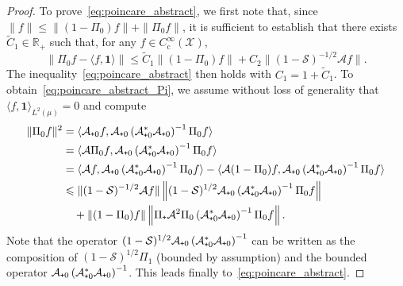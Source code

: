 \documentclass{article}
\newcommand{\cLs}{\mathcal{S}}
\newcommand{\cLa}{\mathcal{A}}
\newcommand{\cX}{\mathcal{X}}
\newcommand{\subplus}{\textnormal{\texttt{+}}}
\renewcommand{\leq}{\leqslant}
\begin{document}
\begin{proof}
To prove~\eqref{eq:poincare_abstract}, we first note that, since $\| f \| \leq \| (1-\Pi_0)f \| + \| \Pi_0 f \|$, it is sufficient to establish that there exists $\widetilde{C}_1 \in \mathbb{R}_+$ such that, for any $f \in C_\mathrm{c}^\infty(\cX)$,
\begin{equation}
  \label{eq:poincare_abstract_Pi}
  \left\| \Pi_0 f - \langle f,\mathbf{1}\rangle \right\| \leq \widetilde{C}_1 \| (1-\Pi_0)f \| + C_2 \| (1-\cLs)^{-1/2} \cLa f \|.
\end{equation}
The inequality~\eqref{eq:poincare_abstract} then holds with $C_1 = 1 + \widetilde{C}_1$. To obtain~\eqref{eq:poincare_abstract_Pi}, we assume without loss of generality that $\langle f,\mathbf{1}\rangle_{L^2(\mu)} = 0$ and compute
\[
  \begin{aligned}
    \| \Pi_0 f \|^2 & = \langle \cLa_{\subplus 0} f , \cLa_{\subplus 0} \left(\cLa_{\subplus 0}^* \cLa_{\subplus 0}\right)^{-1} \Pi_0 f \rangle  \\
    & = \langle \cLa \Pi_0 f , \cLa_{\subplus 0} \left(\cLa_{\subplus 0}^* \cLa_{\subplus 0}\right)^{-1} \Pi_0 f \rangle  \\
    & = \langle \cLa f , \cLa_{\subplus 0} \left(\cLa_{\subplus 0}^* \cLa_{\subplus 0}\right)^{-1} \Pi_0 f \rangle - \langle \cLa (1-\Pi_0) f , \cLa_{\subplus 0} \left(\cLa_{\subplus 0}^* \cLa_{\subplus 0}\right)^{-1} \Pi_0 f \rangle \\
    & \leq \|(1-\cLs)^{-1/2}\cLa f\| \left\|(1-\cLs)^{1/2} \cLa_{\subplus 0} \left(\cLa_{\subplus 0}^* \cLa_{\subplus 0}\right)^{-1} \Pi_0 f \right\| \\
    & \ \ \ + \|(1-\Pi_0)f\| \left\| \Pi_\subplus \cLa^2 \Pi_0 \left(\cLa_{\subplus 0}^* \cLa_{\subplus 0}\right)^{-1} \Pi_0 f \right\|. 
  \end{aligned}
\]
Note that the operator $(1-\cLs)^{1/2} \cLa_{\subplus 0} \left(\cLa_{\subplus 0}^* \cLa_{\subplus 0}\right)^{-1}$ can be written as the composition of $(1-\cLs)^{1/2} \Pi_1$ (bounded by assumption) and the bounded operator $\cLa_{\subplus 0} \left(\cLa_{\subplus 0}^* \cLa_{\subplus 0}\right)^{-1}$. This leads finally to~\eqref{eq:poincare_abstract}.
\end{proof}
\end{document}
